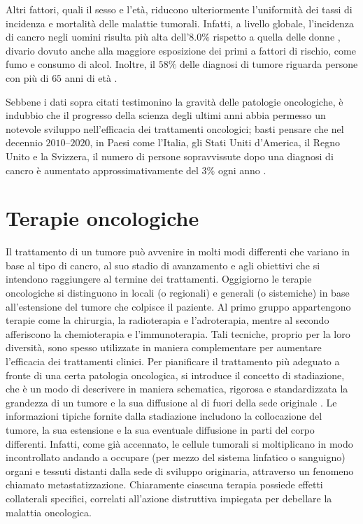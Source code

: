 \documentclass[12pt,a4paper,twoside]{report}
\begin{document}
	Altri fattori, quali il sesso e l'età, riducono ulteriormente l'uniformità dei tassi di incidenza e mortalità delle malattie tumorali. Infatti, a livello globale, l'incidenza di cancro negli uomini risulta più alta dell'$8.0\%$ rispetto a quella delle donne \cite{gco2}, divario dovuto anche alla maggiore esposizione dei primi a fattori di rischio, come fumo e consumo di alcol. Inoltre, il $58\%$ delle diagnosi di tumore riguarda persone con più di $65$ anni di età \cite{uscs}.
	
	Sebbene i dati sopra citati testimonino la gravità delle patologie oncologiche, è indubbio che il progresso della scienza degli ultimi anni abbia permesso un notevole sviluppo nell'efficacia dei trattamenti oncologici; basti pensare che nel decennio $2010$--$2020$, in Paesi come l'Italia, gli Stati Uniti d'America, il Regno Unito e la Svizzera, il numero di persone sopravvissute dopo una diagnosi di cancro è aumentato approssimativamente del $3\%$ ogni anno \cite{Guzzinati2018-sf}.
	
	\section{Terapie oncologiche}\label{sec:1.2}
	Il trattamento di un tumore può avvenire in molti modi differenti che variano in base al tipo di cancro, al suo stadio di avanzamento e agli obiettivi che si intendono raggiungere al termine dei trattamenti. Oggigiorno le terapie oncologiche si distinguono in locali (o regionali) e generali (o sistemiche) in base all'estensione del tumore che colpisce il paziente. Al primo gruppo appartengono terapie come la chirurgia, la radioterapia e l'adroterapia, mentre al secondo afferiscono la chemioterapia e l'immunoterapia. Tali tecniche, proprio per la loro diversità, sono spesso utilizzate in maniera complementare per aumentare l'efficacia dei trattamenti clinici. Per pianificare il trattamento più adeguato a fronte di una certa patologia oncologica, si introduce il concetto di stadiazione, che è un modo di descrivere in maniera schematica, rigorosa e standardizzata la grandezza di un tumore e la sua diffusione al di fuori della sede originale \cite{airc}. Le informazioni tipiche fornite dalla stadiazione includono la collocazione del tumore, la sua estensione e la sua eventuale diffusione in parti del corpo differenti. Infatti, come già accennato, le cellule tumorali si moltiplicano in modo incontrollato andando a occupare (per mezzo del sistema linfatico o sanguigno) organi e tessuti distanti dalla sede di sviluppo originaria, attraverso un fenomeno chiamato metastatizzazione. Chiaramente ciascuna terapia possiede effetti collaterali specifici, correlati all'azione distruttiva impiegata per debellare la malattia oncologica.
	
\end{document}
